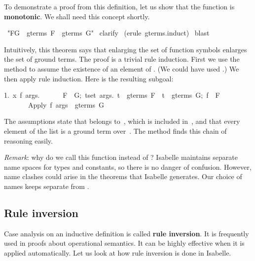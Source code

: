 To demonstrate a proof from this definition, let us 
show that the function 
is \textbf{monotonic}.  We shall need this concept shortly.
\begin{isabelle}
\ "F\isasymsubseteq G\ \isasymLongrightarrow \ gterms\ F\ \isasymsubseteq \ gterms\ G"\isanewline
{}\ clarify\isanewline
{}\ (erule\ gterms.induct)\isanewline
{}\ blast\isanewline
{}
\end{isabelle}
Intuitively, this theorem says that
enlarging the set of function symbols enlarges the set of ground 
terms. The proof is a trivial rule induction.
First we use the  method to assume the existence of an element of
.  (We could have used .)  We then
apply rule induction. Here is the resulting subgoal: 
\begin{isabelle}
1.\ \isasymAnd x\ f\ args.\isanewline
\ \ \ \ \ \ \isasymlbrakk F\ \isasymsubseteq \ G;\ \isasymforall t\isasymin set\ args.\ t\ \isasymin \ gterms\ F\ \isasymand \ t\ \isasymin \ gterms\ G;\ f\ \isasymin \ F\isasymrbrakk \isanewline
\ \ \ \ \ \ \isasymLongrightarrow \ Apply\ f\ args\ \isasymin \ gterms\ G%
\end{isabelle}
%
The assumptions state that  belongs 
to~, which is included in~, and that every element of the list  is
a ground term over~.  The  method finds this chain of reasoning easily.  

\textit{Remark}: why do we call this function  instead 
of {}? Isabelle maintains separate name spaces for types 
and constants, so there is no danger of confusion. However, name 
clashes could arise in the theorems that Isabelle generates. 
Our choice of names keeps {} separate from {}.

\subsection{Rule inversion}\label{sec:rule-inversion}

Case analysis on an inductive definition is called \textbf{rule inversion}. 
It is frequently used in proofs about operational semantics.  It can be
highly effective when it is applied automatically.  Let us look at how rule
inversion is done in Isabelle.

